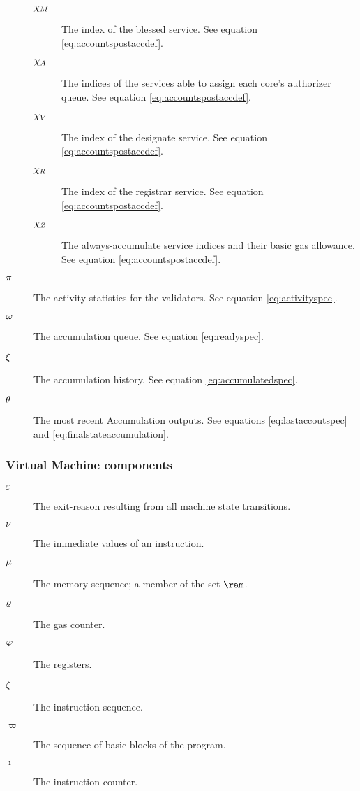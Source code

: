 \begin{description}
\begin{description}
    \item[$\chi_M$] The index of the blessed service. See equation \ref{eq:accountspostaccdef}.
    \item[$\chi_A$] The indices of the services able to assign each core's authorizer queue. See equation \ref{eq:accountspostaccdef}.
    \item[$\chi_V$] The index of the designate service. See equation \ref{eq:accountspostaccdef}.
    \item[$\chi_R$] The index of the registrar service. See equation \ref{eq:accountspostaccdef}.
    \item[$\chi_Z$] The always-accumulate service indices and their basic gas allowance. See equation \ref{eq:accountspostaccdef}.
  \end{description}
  \item[$\pi$] The activity statistics for the validators. See equation \ref{eq:activityspec}.
  \item[$\omega$] The accumulation queue. See equation \ref{eq:readyspec}.
  \item[$\xi$] The accumulation history. See equation \ref{eq:accumulatedspec}.
  \item[$\theta$] The most recent Accumulation outputs. See equations \ref{eq:lastaccoutspec} and \ref{eq:finalstateaccumulation}.
\end{description}

\subsubsection{Virtual Machine components}

\begin{description}
  \item[$\varepsilon$] The exit-reason resulting from all machine state transitions.
  \item[$\nu$] The immediate values of an instruction.
  \item[$\mu$] The memory sequence; a member of the set $\ram$.
  \item[$\varrho$] The gas counter.
  \item[$\varphi$] The registers.
  \item[$\zeta$] The instruction sequence.
  \item[$\varpi$] The sequence of basic blocks of the program.
  \item[$\imath$] The instruction counter.
\end{description}

